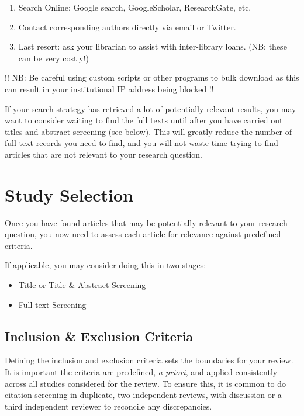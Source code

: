 \documentclass[
]{book}
\providecommand{\tightlist}{%
  \setlength{\itemsep}{0pt}\setlength{\parskip}{0pt}}
\begin{document}
\begin{enumerate}
\def\labelenumi{\arabic{enumi}.}
\setcounter{enumi}{1}
\item
  Search Online: Google search, GoogleScholar, ResearchGate, etc.
\item
  Contact corresponding authors directly via email or Twitter.
\item
  Last resort: ask your librarian to assist with inter-library loans. (NB: these can be very costly!)
\end{enumerate}

!! NB: Be careful using custom scripts or other programs to bulk download as this can result in your institutional IP address being blocked !!

If your search strategy has retrieved a lot of potentially relevant results, you may want to consider waiting to find the full texts until after you have carried out titles and abstract screening (see below). This will greatly reduce the number of full text records you need to find, and you will not waste time trying to find articles that are not relevant to your research question.

\hypertarget{study-selection}{%
\chapter{Study Selection}\label{study-selection}}

Once you have found articles that may be potentially relevant to your research question, you now need to assess each article for relevance against predefined criteria.

If applicable, you may consider doing this in two stages:

\begin{itemize}
\tightlist
\item
  Title or Title \& Abstract Screening
\item
  Full text Screening
\end{itemize}

\hypertarget{inclusion-exclusion-criteria}{%
\section{Inclusion \& Exclusion Criteria}\label{inclusion-exclusion-criteria}}

Defining the inclusion and exclusion criteria sets the boundaries for your review.
It is important the criteria are predefined, \emph{a priori}, and applied consistently across all studies considered for the review. To ensure this, it is common to do citation screening in duplicate, two independent reviews, with discussion or a third independent reviewer to reconcile any discrepancies.
\end{document}
